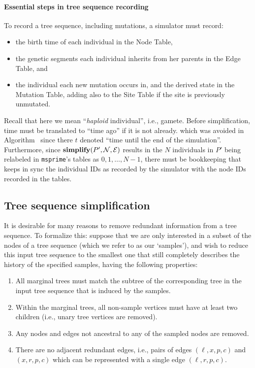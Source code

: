 \documentclass{article}
\newcommand{\msprime}{\texttt{msprime}}
\newcommand{\Nt}{\mathcal{N}}  %
\newcommand{\Et}{\mathcal{E}}  %
\newcommand{\tsimplify}[1]{\mbox{\textbf{simplify}}(#1)}
\begin{document}
\paragraph{Essential steps in tree sequence recording}
To record a tree sequence, including mutations,
a simulator must record:
\begin{itemize}
    \item the birth time of each individual in the Node Table,
    \item the genetic segments each individual inherits from her parents in the Edge Table, and
    \item the individual each new mutation occurs in, and the derived state in the Mutation Table,
        adding also to the Site Table if the site is previously unmutated.
\end{itemize}
Recall that here we mean ``\emph{haploid} individual'', i.e., gamete.
Before simplification, time must be translated to ``time ago'' if it is not already.
which was avoided in Algorithm~ since there $t$ denoted
``time until the end of the simulation''.
Furthermore, since $\tsimplify{P', \Nt, \Et}$ results in the $N$ individuals in $P'$
being relabeled in \msprime{}'s tables as $0, 1, \ldots, N-1$,
there must be bookkeeping that keeps in sync the individual IDs as recorded by the simulator
with the node IDs recorded in the tables.

\subsection*{Tree sequence simplification}
\label{ss:simplify}

It is desirable for many reasons to remove redundant information from a tree sequence.
To formalize this:
suppose that we are only interested in a subset of the nodes of a tree sequence
(which we refer to as our `samples'),
and wish to reduce this input tree sequence
to the smallest one that still completely describes the history of the specified samples,
having the following properties:
\begin{enumerate}

\item All marginal trees must match the subtree
        of the corresponding tree in the input tree sequence
        that is induced by the samples.

\item Within the marginal trees, all non-sample vertices must have at least
        two children (i.e., unary tree vertices are removed).

\item Any nodes and edges not ancestral to any of the sampled nodes are removed.

\item There are no adjacent redundant edges, i.e., pairs of edges
    $(\ell, x, p, c)$ and $(x, r, p, c)$ which can be represented with a single edge
    $(\ell, r, p, c)$.

\end{enumerate}
\end{document}
